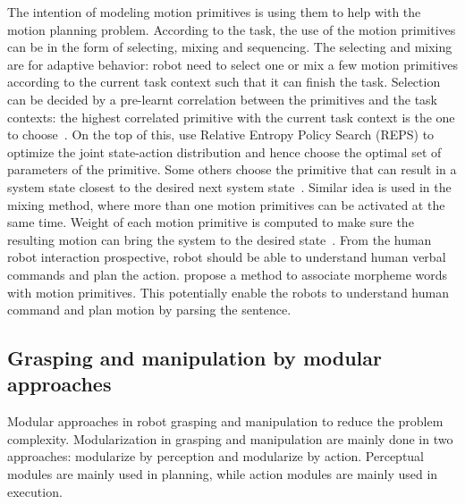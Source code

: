 The intention of modeling motion primitives is using them to help with the motion planning problem. According to the task, the use of the motion primitives can be in the form of selecting, mixing and sequencing. The selecting and mixing are for adaptive behavior: robot need to select one or mix a few motion primitives according to the current task context such that it can finish the task.
Selection can be decided by a pre-learnt correlation between the primitives and the task contexts: the highest correlated primitive with the current task context is the one to choose~\citep{takano2006primitive}. On the top of this, \citet{daniel2013learning} use Relative Entropy Policy Search (REPS) to optimize the joint state-action distribution and hence choose the optimal set of parameters of the primitive.
Some others choose the primitive that can result in a system state closest to the desired next system state~\citep{hauser2008using}. Similar idea is used in the mixing method, where more than one motion primitives can be activated at the same time. Weight of each motion primitive is computed to make sure the resulting motion can bring the system to the desired state~\citep{bidan2013robio,sugimoto2012emosaic}. From the human robot interaction prospective, robot should be able to understand human verbal commands and plan the action. \citet{takano2008integrating} propose a method to associate morpheme words with motion primitives. This potentially enable the robots to understand human command and plan motion by parsing the sentence.




\subsection{Grasping and manipulation by modular approaches}
\label{cha2:sec3:grasping-modular}

Modular approaches in robot grasping and manipulation to reduce the problem complexity. Modularization in grasping and manipulation are mainly done in two approaches: modularize by perception and modularize by action. Perceptual modules are mainly used in planning, while action modules are mainly used in execution.

